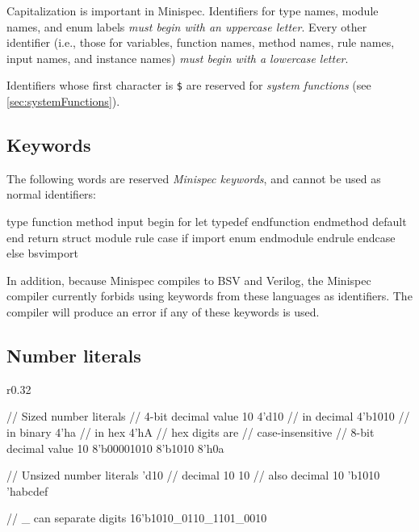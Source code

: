 Capitalization is important in Minispec.
Identifiers for type names, module names, and enum labels \emph{must begin with an uppercase letter}.
Every other identifier (i.e., those for variables, function names, method names, rule names, input names, and instance names)
\emph{must begin with a lowercase letter}.

Identifiers whose first character is \texttt{\$} are reserved for \emph{system functions}
(see \autoref{sec:systemFunctions}).

\vspace{-0.02in}
\subsection{Keywords}

The following words are reserved \emph{Minispec keywords}, and cannot be used as normal identifiers:
\vspace{-0.06in}

\begin{mscode}
type       function       method       input      begin    for          let
typedef    endfunction    endmethod    default    end      return
struct     module         rule         case       if       import
enum       endmodule      endrule      endcase    else     bsvimport    
\end{mscode}

In addition, because Minispec compiles to BSV and Verilog, the Minispec compiler currently forbids using keywords from these languages as identifiers.
The compiler will produce an error if any of these keywords is used.

\subsection{Number literals}

\begin{wrapfigure}{r}{0.32\columnwidth}
\vspace{-2em}
\begin{mscode}
// Sized number literals
// 4-bit decimal value 10
4'd10    // in decimal
4'b1010  // in binary
4'ha     // in hex
4'hA     // hex digits are
         // case-insensitive
// 8-bit decimal value 10
8'b00001010
8'b1010
8'h0a

// Unsized number literals
'd10  // decimal 10
10    // also decimal 10
'b1010
'habcdef

// _ can separate digits
16'b1010_0110_1101_0010
\end{mscode}
\vspace{-2em}
\end{wrapfigure}

